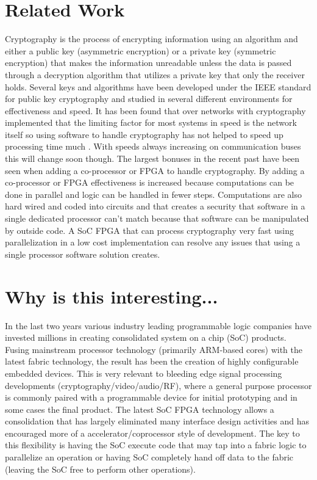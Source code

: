 \documentclass[journal]{IEEEtran}
\begin{document}
\section{Related Work}
Cryptography is the process of encrypting information using an algorithm and either a public key (asymmetric encryption) or a private key (symmetric encryption) that makes the information unreadable unless the data is passed through a decryption algorithm that utilizes a private key that only the receiver holds\cite{HIPPA}. Several keys and algorithms have been developed under the IEEE standard for public key cryptography \cite{IEEESTD} and studied in several different environments for effectiveness and speed. It has been found that over networks with cryptography implemented that the limiting factor for most systems in speed is the network itself so using software to handle cryptography has not helped to speed up processing time much \cite{GUTMANN}. With speeds always increasing on communication buses this will change soon though. The largest bonuses in the recent past have been seen when adding a co-processor or FPGA to handle cryptography. By adding a co-processor or FPGA effectiveness is increased because computations can be done in parallel and logic can be handled in fewer steps\cite{GUERON}. Computations are also hard wired and coded into circuits and that creates a security that software in a single dedicated processor can’t match because that software can be manipulated by outside code\cite{GUTMANN}. A SoC FPGA that can process cryptography very fast using parallelization in a low cost implementation can resolve any issues that using a single processor software solution creates.

\section{Why is this interesting...}
In the last two years various industry leading programmable logic companies have invested millions in creating consolidated system on a chip (SoC) products. Fusing mainstream processor technology (primarily ARM-based cores) with the latest fabric technology, the result has been the creation of highly conﬁgurable embedded devices. This is very relevant to bleeding edge signal processing developments (cryptography/video/audio/RF), where a general purpose processor is commonly paired with a programmable device for initial prototyping and in some cases the ﬁnal product. The latest SoC FPGA technology allows a consolidation that has largely eliminated many interface design activities and has encouraged more of a accelerator/coprocessor style of development. The key to this ﬂexibility is having the SoC execute code that may tap into a fabric logic to parallelize an operation or having SoC completely hand off data to the fabric (leaving the SoC free to perform other operations).
\end{document}
